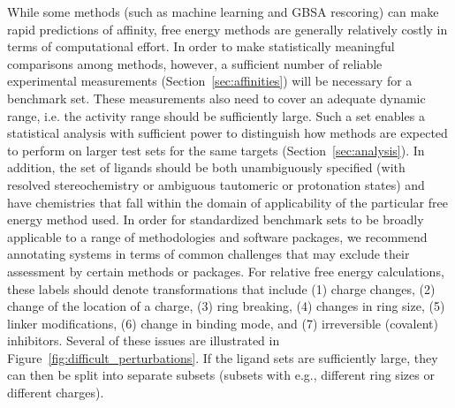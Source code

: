 \documentclass[9pt,bestpractices]{livecoms}
\begin{document}
While some methods (such as machine learning and GBSA rescoring) can make rapid predictions of affinity, free energy methods are generally relatively costly in terms of computational effort. 
In order to make statistically meaningful comparisons among methods, however, a sufficient number of reliable experimental measurements (Section~\ref{sec:affinities}) will be necessary for a benchmark set. These measurements also need to cover an adequate dynamic range, i.e. the activity range should be sufficiently large.   Such a set enables a statistical analysis with sufficient power to distinguish how methods are expected to perform on larger test sets for the same targets (Section~\ref{sec:analysis}).
In addition, the set of ligands should be both unambiguously specified (with resolved stereochemistry or ambiguous tautomeric or protonation states) and have chemistries that fall within the domain of applicability of the particular free energy method used. 
%
In order for standardized benchmark sets to be broadly applicable to a range of methodologies and software packages, we recommend annotating systems in terms of common challenges that may exclude their assessment by certain methods or packages.
For relative free energy calculations, these labels should denote transformations that include
(1) charge changes, 
(2) change of the location of a charge,
(3) ring breaking,
(4) changes in ring size, 
(5) linker modifications,
(6) change in binding mode, 
and (7) irreversible (covalent) inhibitors. 
Several of these issues are illustrated in Figure~\ref{fig:difficult_perturbations}.
%
If the ligand sets are sufficiently large, they can then be split into separate subsets (subsets with e.g., different ring sizes or different charges).
\end{document}
